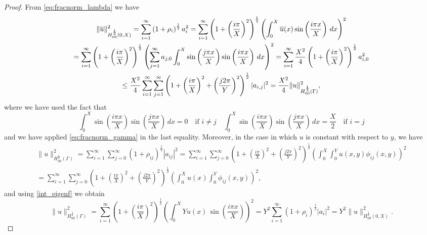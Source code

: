 \begin{proof}
From \eqref{eq:fracnorm_lambda} we have
\begin{multline*}
\|\overline{u}\|^2_{H^{\frac 12}_{00}(0,X)}
=\sum_{i=1}^{\infty} \left( 1+ \rho_{i}\right)^{\frac 12}a_i^2
=\sum_{i=1}^{\infty}\left( 1+ \left(\frac{i\pi}{X}\right)^2\right)^{\frac 12}\left( \int_0^X \overline{u}(x) \sin\left(\frac{i\pi x}{X}\right)\, dx \right)^2
\\
= \sum_{i=1}^{\infty} \left( 1+ \left(\frac{i\pi}{X}\right)^2\right)^{\frac 12}\left( \sum_{j=1}^\infty a_{j,0}\int_0^X \sin\left(\frac{j\pi x}{X}\right) \sin\left(\frac{i\pi x}{X}\right) \, dx  \right)^2
= \sum_{i=1}^{\infty} \frac{X^2}{4} \left( 1+ \left(\frac{i\pi}{X}\right)^2\right)^{\frac 12}a_{i,0}^2
\\
\leq \frac{X^2}{4}\sum_{i=1}^{\infty} \sum_{j=1}^{\infty}  \left( 1+ \left(\frac{i\pi}{X}\right)^2 
+ \left(\frac{j2\pi}{Y}\right)^2\right)^{\frac 12} |a_{i,j}|^2 =\frac{X^2}{4}\|u\|^2_{H^{\frac 12}_{00}(\Gamma)},
\end{multline*}
where we have used the fact that
\begin{equation*}
\int_0^X \sin\left(\frac{i\pi x}{X}\right) \sin\left(\frac{j\pi x}{X}\right)\, dx=0 \quad \text{if $i\neq j$}
\quad
\int_0^X \sin\left(\frac{i\pi x}{X}\right) \sin\left(\frac{j\pi x}{X}\right)\, dx=\frac X2 \quad \text{if $i =j$}
\end{equation*}
and we have applied \eqref{eq:fracnorm_gamma} in the last equality.
Moreover, in the case in which $u$ is constant with respect to $y$, we have
\begin{multline*}
\|u\|^2_{H^{\frac 12}_{00}(\Gamma)}=\sum_{i=1}^{\infty}\sum_{j=0}^{\infty} \left( 1+ \rho_{ij}\right)^{\frac 12}|a_{ij}|^2
=\sum_{i=1}^{\infty}\sum_{j=0}^{\infty} \left(  1+ \left(\frac{i\pi}{X}\right)^2 + \left(\frac{j2\pi}{Y}\right)^2\right)^{\frac 12}\left( \int _0^X\int _0^Y u(x,y )\phi_{ij}(x,y) \right)^2
\\
=\sum_{i=1}^{\infty}\sum_{j=0}^{\infty} \left(  1+ \left(\frac{i\pi}{X}\right)^2 + \left(\frac{j2\pi}{Y}\right)^2\right)^{\frac 12}\left( \int _0^X u(x) \int _0^Y \phi_{ij}(x,y) \right)^2,
\end{multline*}
and using \eqref{int_eigenf} we obtain
\begin{equation*}
\|u\|^2_{H^{\frac 12}_{00}(\Gamma)}=
\sum_{i=1}^{\infty}\left( 1+ \left(\frac{i\pi}{X}\right)^2\right)^{\frac 12}\left(\int _0^X Yu(x)\, \sin\left(\frac{i\pi x}{X}\right)\right)^2
=Y^2 \sum_{i=1}^{\infty}\left( 1+ \rho _i\right)^{\frac 12}|a_i|^2 = Y^2  \|u\|^2_{H^{\frac 12}_{00}(0,X)}.
\end{equation*}
\end{proof}

